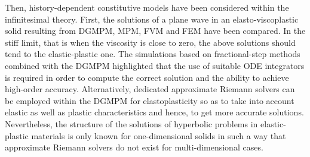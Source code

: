 Then, history-dependent constitutive models have been considered within the infinitesimal theory.
First, the solutions of a plane wave in an elasto-viscoplastic solid resulting from DGMPM, MPM, FVM and FEM have been compared.
In the stiff limit, that is when the viscosity is close to zero, the above solutions should tend to the elastic-plastic one.
The simulations based on fractional-step methods combined with the DGMPM highlighted that the use of suitable ODE integrators is required in order to compute the correct solution and the ability to achieve high-order accuracy.
Alternatively, dedicated approximate Riemann solvers can be employed within the DGMPM for elastoplasticity so as to take into account elastic as well as plastic characteristics and hence, to get more accurate solutions.
Nevertheless, the structure of the solutions of hyperbolic problems in elastic-plastic materials is only known for one-dimensional solids in such a way that approximate Riemann solvers do not exist for multi-dimensional cases.

